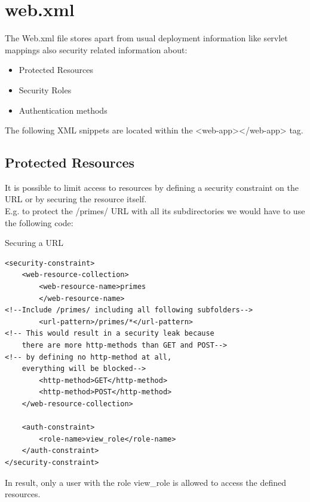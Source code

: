 \documentclass[12pt,a4paper]{report}
\begin{document}
\section{web.xml}
The Web.xml file stores apart from usual deployment information like servlet mappings also security related information about:\\
\begin{itemize}
	\item Protected Resources
	\item Security Roles
	\item Authentication methods
\end{itemize}
The following XML snippets are located within the <web-app></web-app> tag.

\subsection*{Protected Resources}
It is possible to limit access to resources by defining a security constraint on the URL or by securing the resource itself.\\
E.g. to protect the /primes/ URL with all its subdirectories we would have to use the following code:\\
\begin{bclogo}[couleur=yellow!15,arrondi=0.1,logo=\bccrayon, ombre = true]{Securing a URL}
\begin{lstlisting}[style=XML]
<security-constraint>
	<web-resource-collection>
		<web-resource-name>primes
		</web-resource-name>
<!--Include /primes/ including all following subfolders-->
		<url-pattern>/primes/*</url-pattern>
<!-- This would result in a security leak because 
	there are more http-methods than GET and POST-->
<!-- by defining no http-method at all, 
	everything will be blocked-->
		<http-method>GET</http-method>
		<http-method>POST</http-method>
	</web-resource-collection>
	
	<auth-constraint>
		<role-name>view_role</role-name>
	</auth-constraint>
</security-constraint>
\end{lstlisting}
\end{bclogo}
In result, only a user with the role view\_role is allowed to access the defined resources.
\end{document}
